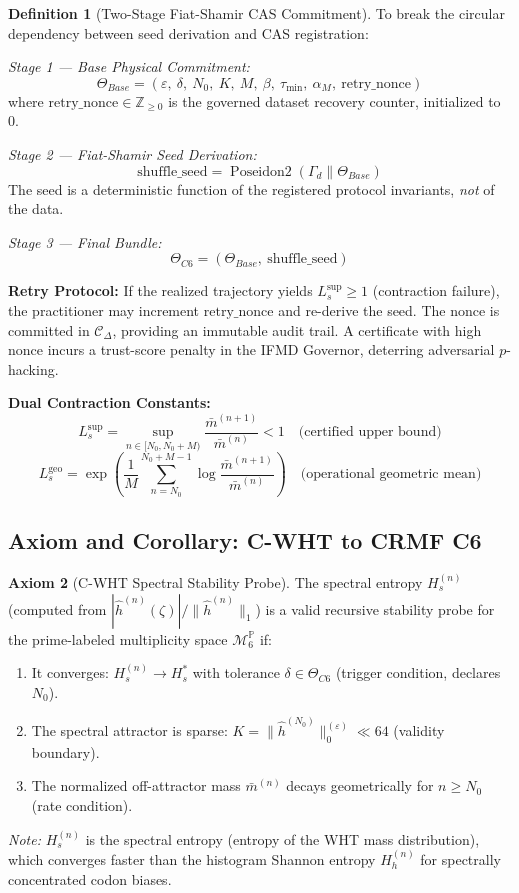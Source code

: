 \documentclass[12pt,letterpaper]{article}
\theoremstyle{definition}
\newtheorem{definition}{Definition}[section]
\newtheorem{axiom}[definition]{Axiom}
\theoremstyle{plain}
\theoremstyle{remark}
\newcommand{\Poseidon}{\operatorname{Poseidon2}}
\newcommand{\Tbase}{\Theta_{Base}}
\newcommand{\TC}{\Theta_{C6}}
\newcommand{\hhat}{\hat{h}}
\newcommand{\mbar}{\bar{m}}
\newcommand{\Lsup}{L_s^{\sup}}
\newcommand{\Lgeo}{L_s^{\mathrm{geo}}}
\newcommand{\CDelta}{\mathcal{C}_{\Delta}}
\begin{document}
\begin{definition}[Two-Stage Fiat-Shamir CAS Commitment]
To break the circular dependency between seed derivation and CAS registration:

\noindent\textit{Stage 1 --- Base Physical Commitment:}
\[
  \Tbase = (\varepsilon,\ \delta,\ N_0,\ K,\ M,\ \beta,\ \tau_{\min},\ \alpha_M,\ \mathrm{retry\_nonce})
\]
where $\mathrm{retry\_nonce} \in \mathbb{Z}_{\ge 0}$ is the governed dataset recovery counter, initialized to 0.

\noindent\textit{Stage 2 --- Fiat-Shamir Seed Derivation:}
\[
  \mathrm{shuffle\_seed} = \Poseidon(\Gamma_d \| \Tbase)
\]
The seed is a deterministic function of the registered protocol invariants, \emph{not} of the data.

\noindent\textit{Stage 3 --- Final Bundle:}
\[
  \TC = (\Tbase,\ \mathrm{shuffle\_seed})
\]

\textbf{Retry Protocol:} If the realized trajectory yields $\Lsup \ge 1$ (contraction failure), the practitioner may increment $\mathrm{retry\_nonce}$ and re-derive the seed. The nonce is committed in $\CDelta$, providing an immutable audit trail. A certificate with high nonce incurs a trust-score penalty in the IFMD Governor, deterring adversarial $p$-hacking.

\textbf{Dual Contraction Constants:}
\[
  \Lsup = \sup_{n \in [N_0, N_0+M)} \frac{\mbar^{(n+1)}}{\mbar^{(n)}} < 1
  \quad\text{(certified upper bound)}
\]
\[
  \Lgeo = \exp\!\left(\frac{1}{M}\sum_{n=N_0}^{N_0+M-1} \log \frac{\mbar^{(n+1)}}{\mbar^{(n)}}\right)
  \quad\text{(operational geometric mean)}
\]
\end{definition}

\subsection{Axiom and Corollary: C-WHT to CRMF C6}

\begin{axiom}[C-WHT Spectral Stability Probe]
The spectral entropy $H_s^{(n)}$ (computed from $|\hhat^{(n)}(\zeta)|/\|\hhat^{(n)}\|_1$) is a valid recursive stability probe for the prime-labeled multiplicity space $\mathcal{M}_6^{\mathbb{P}}$ if:
\begin{enumerate}
  \item It converges: $H_s^{(n)} \to H_s^*$ with tolerance $\delta \in \TC$ (trigger condition, declares $N_0$).
  \item The spectral attractor is sparse: $K = \|\hhat^{(N_0)}\|_0^{(\varepsilon)} \ll 64$ (validity boundary).
  \item The normalized off-attractor mass $\mbar^{(n)}$ decays geometrically for $n \ge N_0$ (rate condition).
\end{enumerate}
\emph{Note:} $H_s^{(n)}$ is the spectral entropy (entropy of the WHT mass distribution), which converges faster than the histogram Shannon entropy $H_h^{(n)}$ for spectrally concentrated codon biases.
\end{axiom}
\end{document}
